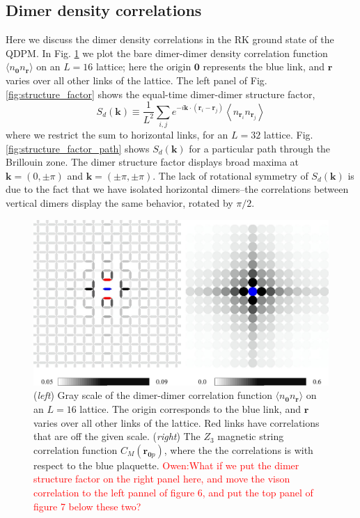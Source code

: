\documentclass[twocolumn,prb,aps,floatfix,superscriptaddress]{revtex4-1}
\newcommand{\figref}[1]{Fig. \ref{#1}}
\newcommand{\note}[1]{\textcolor{red}{#1}}
\begin{document}
\subsection{Dimer density correlations}

Here we discuss the dimer density correlations in the RK ground state of the QDPM. In \figref{fig:dimer_vison_heatmap} we plot the bare dimer-dimer density correlation function $\langle n_{\bm{0}} n_{\bm{r}}\rangle$ on an $L=16$ lattice; here the origin $\bm{0}$ represents the blue link, and $\bm{r}$ varies over all other links of the lattice. The left panel of \figref{fig:structure_factor} shows the equal-time dimer-dimer structure factor, 
\begin{equation}
S_d\left( \bm{k} \right) \equiv \frac{1}{ L^2} \sum_{i,j} e^{-i \bm{k} \cdot \left(\bm{r}_i - \bm{r}_j\right)} \left \langle n_{\bm{r}_i} n_{\bm{r}_j} \right \rangle
\end{equation}
where we restrict the sum to horizontal links, for an $L=32$ lattice. \figref{fig:structure_factor_path} shows $S_d(\bm{k})$ for a particular path through the Brillouin zone. The dimer structure factor displays broad maxima at $\bm{k} = (0, \pm \pi)$ and $\bm{k} = (\pm \pi, \pm \pi)$. The lack of rotational symmetry of $S_d(\bm{k})$ is due to the fact that we have isolated horizontal dimers--the correlations between vertical dimers display the same behavior, rotated by $\pi/2$.


    \begin{figure}
        \centering
        \includegraphics[width=1.0\columnwidth]{dimer_gry_scale_qdpm.pdf}
        \caption{({\it left}) Gray scale of the dimer-dimer correlation function $\langle n_{\bm{0}} n_{\bm{r}}\rangle$ on an $L=16$ lattice. The origin corresponds to the blue link, and $\bm{r}$ varies over all other links of the lattice. Red links have correlations that are off the given scale. ({\it right}) The $Z_3$ magnetic string correlation function $C_M(\bm{r}_{\bm{0}p})$, where the the correlations is with respect to the blue plaquette. \note{Owen:What if we put the dimer structure factor on the right panel here, and move the vison correlation to the left pannel of figure 6, and put the top panel of figure 7 below these two?}}
        \label{fig:dimer_vison_heatmap}
    \end{figure}
\end{document}
